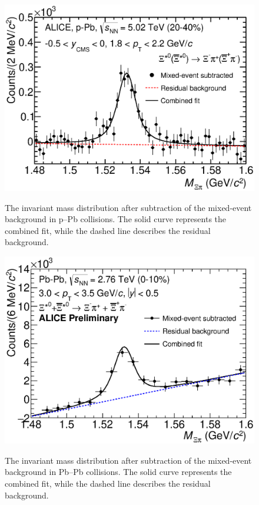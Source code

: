 \begin{figure}[htbp]
\begin{center}
\includegraphics[width=12.0cm]{./Version1/FigChapter5/Extraction/SigpPb_After.eps}
\hspace{0.5cm}
\label{fig:sigpPba} 
\caption{ The invariant mass distribution after subtraction of the mixed-event background in p--Pb collisions. 
The solid curve represents the combined fit, while the dashed line describes the residual background.}
\end{center}
\end{figure}


\begin{figure}[htbp]
\begin{center}
\includegraphics[width=12.0cm]{./Version1/FigChapter5/Extraction/SigPbPb_After.eps}
\hspace{0.5cm}
\label{fig:sigpPba} 
\caption{ The invariant mass distribution after subtraction of the mixed-event background in Pb--Pb collisions. 
The solid curve represents the combined fit, while the dashed line describes the residual background.}
\end{center}
\end{figure}

